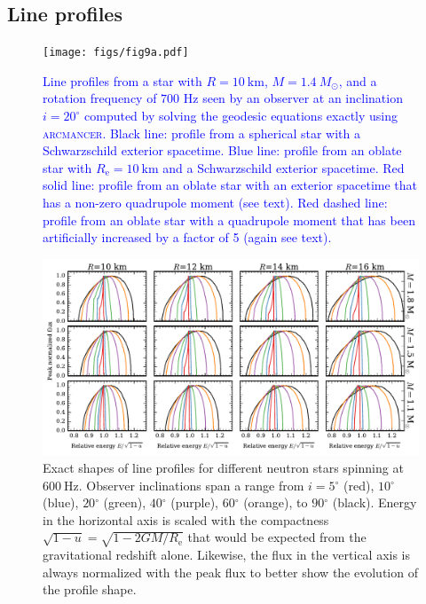 \documentclass{aa}
\newcommand{\refe}[1]{\textcolor{blue}{{#1}}}
\newcommand{\Msun}{\ensuremath{M_{\odot}}}
\renewcommand{\deg}{\ensuremath{^{\circ}}}
\begin{document}
\subsection{Line profiles}

\begin{figure}
\texttt{[image: figs/fig9a.pdf]}
\caption{\label{fig:line_profiles}
    \refe{
Line profiles from a star with $R = 10~\mathrm{km}$, $M = 1.4~\Msun$, and a rotation frequency of $700$ Hz seen by an observer at an inclination $i = 20^{\circ}$ \refe{computed by solving the geodesic equations exactly using \textsc{arcmancer}}.
Black line: profile from a spherical star with a Schwarzschild exterior spacetime. 
Blue line: profile from an oblate star with $R_{\mathrm{e}} = 10~\mathrm{km}$ and a Schwarzschild exterior spacetime. 
Red solid line: profile from an oblate star with an exterior spacetime that has a non-zero quadrupole moment (see text). 
    Red dashed line: profile from an oblate star with a quadrupole moment that has been artificially increased by a factor of 5 (again see text).
    }
}
\end{figure}



\begin{figure}[htbp!]
\centering
    \includegraphics[width=18cm]{figs/sweep_grid.pdf}
\caption{\label{fig:sweep}
    Exact shapes of line profiles for different neutron stars spinning at $600~\mathrm{Hz}$.
Observer inclinations span a range from $i=5\deg$ (red), $10\deg$ (blue), $20\deg$ (green), $40\deg$ (purple), $60\deg$ (orange), to $90\deg$ (black).
Energy in the horizontal axis is scaled with the compactness $\sqrt{1-u} = \sqrt{1-2GM/R_{\mathrm{e}}}$ that would be expected from the gravitational redshift alone.
Likewise, the flux in the vertical axis is always normalized with the peak flux to better show the evolution of the profile shape.
}
\end{figure}
\end{document}
